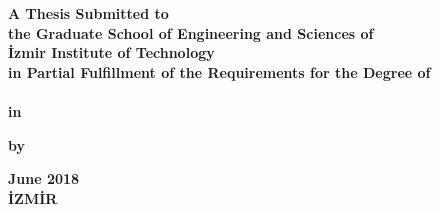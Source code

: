 \begin{titlepage}
	\newcommand*{\titlefont}[1]{\textbf{\fontsize{18pt}{27pt}\selectfont #1}}
	\newcommand*{\subtitlefont}[1]{\textbf{\setstretch{1}\fontsize{14pt}{21pt}\selectfont#1}}
	\begin{center}
		\vspace*{3em}  %
		\titlefont{
			\showthesistitle
		}
		
		\vspace{10em}
		\subtitlefont{
		A Thesis Submitted to\\
		the Graduate School of Engineering and Sciences of\\
		İzmir Institute of Technology\\
		in Partial Fulfillment of the Requirements for the Degree of\linebreak\\
		\showthesisdegree\linebreak\\%
		in \showthesismajor  %
		}
		
		\vspace{4em}
		
		\subtitlefont{
		by\\
		\showthesisauthor  %
		}
		
		\vspace{7em}
		
		\subtitlefont{
			June 2018\\  %
			İZMİR
		}
	\end{center}
\end{titlepage}
\addtocounter{page}{1}